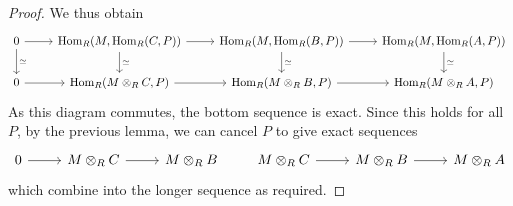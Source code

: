 \begin{proof}
    We thus obtain
\[\begin{tikzcd}
	0 & {\Hom_R(M, \Hom_R(C, P))} & {\Hom_R(M, \Hom_R(B, P))} & {\Hom_R(M, \Hom_R(A, P))} \\
	0 & {\Hom_R(M \otimes_R C, P)} & {\Hom_R(M \otimes_R B, P)} & {\Hom_R(M \otimes_R A, P)}
	\arrow[from=2-1, to=2-2]
	\arrow[from=2-2, to=2-3]
	\arrow[from=2-3, to=2-4]
	\arrow[from=1-1, to=1-2]
	\arrow[from=1-2, to=1-3]
	\arrow[from=1-3, to=1-4]
	\arrow["\simeq", from=1-4, to=2-4]
	\arrow["\simeq", from=1-3, to=2-3]
	\arrow["\simeq", from=1-2, to=2-2]
	\arrow["\simeq", from=1-1, to=2-1]
\end{tikzcd}\]
    As this diagram commutes, the bottom sequence is exact.
    Since this holds for all \( P \), by the previous lemma, we can cancel \( P \) to give exact sequences
\[\begin{tikzcd}
	0 & {M \otimes_R C} & {M \otimes_R B}
	\arrow[from=1-2, to=1-3]
	\arrow[from=1-1, to=1-2]
\end{tikzcd}
\quad\quad
\begin{tikzcd}
	{M \otimes_R C} & {M \otimes_R B} & {M \otimes_R A}
	\arrow[from=1-1, to=1-2]
	\arrow[from=1-2, to=1-3]
\end{tikzcd}\]
    which combine into the longer sequence as required.
\end{proof}
